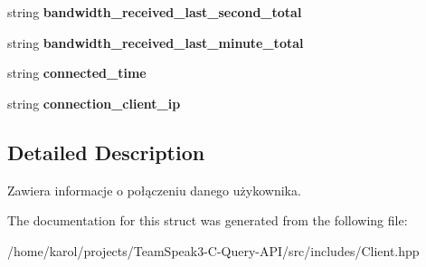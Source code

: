 \begin{DoxyCompactItemize}
\item 
string {\bfseries bandwidth\+\_\+received\+\_\+last\+\_\+second\+\_\+total}\hypertarget{struct_ts3_api_1_1_client_1_1connection_info_a6d4a4fba176a5934105f604afa6c9c57}{}\label{struct_ts3_api_1_1_client_1_1connection_info_a6d4a4fba176a5934105f604afa6c9c57}

\item 
string {\bfseries bandwidth\+\_\+received\+\_\+last\+\_\+minute\+\_\+total}\hypertarget{struct_ts3_api_1_1_client_1_1connection_info_a3447203e856648cd195d1cc4466cccc1}{}\label{struct_ts3_api_1_1_client_1_1connection_info_a3447203e856648cd195d1cc4466cccc1}

\item 
string {\bfseries connected\+\_\+time}\hypertarget{struct_ts3_api_1_1_client_1_1connection_info_a898099df806c6f2ac4843b1f8cc2a6a1}{}\label{struct_ts3_api_1_1_client_1_1connection_info_a898099df806c6f2ac4843b1f8cc2a6a1}

\item 
string {\bfseries connection\+\_\+client\+\_\+ip}\hypertarget{struct_ts3_api_1_1_client_1_1connection_info_a2b0506154b5a4d7a1c3e4f3dce87b52c}{}\label{struct_ts3_api_1_1_client_1_1connection_info_a2b0506154b5a4d7a1c3e4f3dce87b52c}

\end{DoxyCompactItemize}


\subsection{Detailed Description}
Zawiera informacje o połączeniu danego użykownika. 

The documentation for this struct was generated from the following file\+:\begin{DoxyCompactItemize}
\item 
/home/karol/projects/\+Team\+Speak3-\/\+C-\/\+Query-\/\+A\+P\+I/src/includes/Client.\+hpp\end{DoxyCompactItemize}
